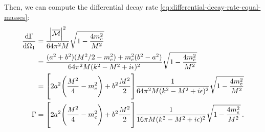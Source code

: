 \documentclass[main.tex]{subfiles}
\begin{document}
Then, we can compute the differential decay rate \eqref{eq:differential-decay-rate-equal-masses}: 
%
\begin{align}
\dv{\Gamma}{\Omega_1 } &= \frac{\abs{\mathcal{\overline{M}}}^2}{64 \pi^2 M}\sqrt{1 - \frac{4 m_e^2}{M^2}}  \\ 
&=\frac{(a^2 + b^2)(M^2 /2- m_e^2) + m_e^2 (b^2 - a^2)}{64 \pi^2 M (k^2 -M^2+ i \epsilon)^2}
\sqrt{1 - \frac{4 m_e^2}{M^2}}  \\
&= \qty[2 a^2 \qty( \frac{M^2}{4 } - m_e^2) + b^2 \frac{M^2}{2}] \frac{1}{64 \pi^2 M (k^2 -M^2+ i \epsilon)^2}
\sqrt{1 - \frac{4 m_e^2}{M^2}}  \\
\Gamma &= \qty[2 a^2 \qty( \frac{M^2}{4 } - m_e^2) + b^2 \frac{M^2}{2}] \frac{1}{16 \pi M (k^2 -M^2+ i \epsilon)^2}
\sqrt{1 - \frac{4 m_e^2}{M^2}}
\,.
\end{align}
\end{document}
